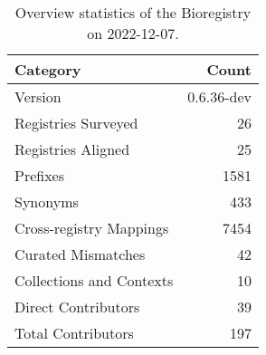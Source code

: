 \begin{table}
\centering
\caption{Overview statistics of the Bioregistry on 2022-12-07.}
\label{tab:bioregistry-summary}
\begin{tabular}{lr}
\toprule
                Category &      Count \\
\midrule
                 Version & 0.6.36-dev \\
     Registries Surveyed &         26 \\
      Registries Aligned &         25 \\
                Prefixes &       1581 \\
                Synonyms &        433 \\
 Cross-registry Mappings &       7454 \\
      Curated Mismatches &         42 \\
Collections and Contexts &         10 \\
     Direct Contributors &         39 \\
      Total Contributors &        197 \\
\bottomrule
\end{tabular}
\end{table}
